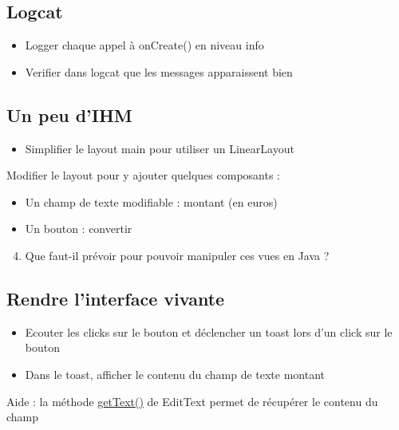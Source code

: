 \documentclass{article}
\begin{document}
\subsection{Logcat}
\begin{itemize}
\item Logger chaque appel à onCreate() en niveau info
\item Verifier dans logcat que les messages apparaissent bien
\end{itemize}
\subsection{Un peu d'IHM}
\begin{itemize}
  \item Simplifier le layout main pour utiliser un LinearLayout
\end{itemize}
Modifier le layout pour y ajouter quelques composants :
\begin{itemize}
\item Un champ de texte modifiable : montant (en euros)
\item Un bouton : convertir
\end{itemize}
\begin{enumerate}
 \setcounter{enumi}{3}
\item Que faut-il prévoir pour pouvoir manipuler ces vues en Java ?
\end{enumerate}
\subsection{Rendre l'interface vivante}
\begin{itemize}
\item Ecouter les clicks sur le bouton et déclencher un toast lors d'un click sur le bouton
\item Dans le toast, afficher le contenu du champ de texte montant
\end{itemize}
Aide : la méthode
\href{http://developer.android.com/reference/android/widget/EditText.html#getText()}{getText()} de EditText permet de récupérer le contenu du champ
\end{document}
